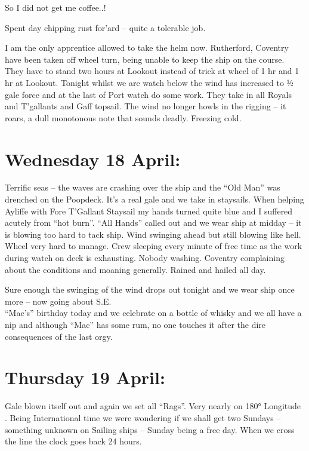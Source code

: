 \documentclass[
  11pt,
  msmallroyalvopaper
]{memoir}
\begin{document}
So I did not get me coffee..!

Spent day chipping rust for'ard -- quite a tolerable job.

I am the only apprentice allowed to take the helm now. Rutherford,
Coventry have been taken off wheel turn, being unable to keep the ship
on the course. They have to stand two hours at Lookout instead of trick
at wheel of 1 hr and 1 hr at Lookout. Tonight whilst we are watch below
the wind has increased to ½ gale force and at the last of Port watch do
some work. They take in all Royals and T'gallants and Gaff topsail. The
wind no longer howls in the rigging -- it roars, a dull monotonous note
that sounds deadly. Freezing cold.

\hypertarget{wednesday-18-april}{%
\section{Wednesday 18 April:}\label{wednesday-18-april}}

Terrific seas -- the waves are crashing over the ship and the ``Old
Man'' was drenched on the Poopdeck. It's a real gale and we take in
staysails. When helping Ayliffe with Fore T'Gallant Staysail my hands
turned quite blue and I suffered acutely from ``hot burn''. ``All
Hands'' called out and we wear ship at midday -- it is blowing too hard
to tack ship. Wind swinging ahead but still blowing like hell. Wheel
very hard to manage. Crew sleeping every minute of free time as the work
during watch on deck is exhausting. Nobody washing. Coventry complaining
about the conditions and moaning generally. Rained and hailed all day.

Sure enough the swinging of the wind drops out tonight and we wear ship
once more -- now going about S.E.\\
``Mac's'' birthday today and we celebrate on a bottle of whisky and we
all have a nip and although ``Mac'' has some rum, no one touches it
after the dire consequences of the last orgy.

\hypertarget{thursday-19-april}{%
\section{Thursday 19 April:}\label{thursday-19-april}}

Gale blown itself out and again we set all ``Rags''. Very nearly on 180°
Longitude . Being International time we were wondering if we shall get
two Sundays -- something unknown on Sailing ships -- Sunday being a free
day. When we cross the line the clock goes back 24 hours.
\end{document}
